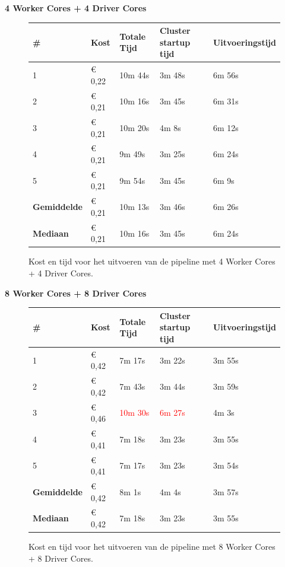 \textbf{4 Worker Cores + 4 Driver Cores}

\begin{figure}[H]%
    \centering
    \begin{tabularx}{1\textwidth}{ |X|X|X|X|X| }
        \hline
        \textbf{\#} & \textbf{Kost} & \textbf{Totale Tijd} & \textbf{Cluster startup tijd} & \textbf{Uitvoeringstijd} \\
        \hline 
        1 & € 0,22 & 10m 44s &  3m 48s & 6m 56s \\
        \hline
        2 & € 0,21 & 10m 16s & 3m 45s & 6m 31s \\
        \hline
        3 & € 0,21 & 10m 20s & 4m 8s & 6m 12s \\
        \hline
        4 & € 0,21 & 9m 49s & 3m 25s & 6m 24s \\
        \hline
        5 & € 0,21 & 9m 54s & 3m 45s & 6m 9s \\
        \hline
        \textbf{Gemiddelde} & € 0,21 & 10m 13s & 3m 46s & 6m 26s \\
        \hline
        \textbf{Mediaan} & € 0,21 & 10m 16s & 3m 45s & 6m 24s \\
        \hline
    \end{tabularx}
    \caption{Kost en tijd voor het uitvoeren van de pipeline met 4 Worker Cores + 4 Driver Cores.}
\end{figure}

\textbf{8 Worker Cores + 8 Driver Cores}

\begin{figure}[H]%
    \centering
    \begin{tabularx}{1\textwidth}{ |X|X|X|X|X| }
        \hline
        \textbf{\#} & \textbf{Kost} & \textbf{Totale Tijd} & \textbf{Cluster startup tijd} & \textbf{Uitvoeringstijd} \\
        \hline 
        1 & € 0,42 & 7m 17s & 3m 22s & 3m 55s \\
        \hline
        2 & € 0,42 & 7m 43s & 3m 44s & 3m 59s \\
        \hline
        3 & € 0,46 & \textcolor{red}{10m 30s} & \textcolor{red}{6m 27s} & 4m 3s \\
        \hline
        4 & € 0,41 & 7m 18s & 3m 23s & 3m 55s \\
        \hline
        5 & € 0,41 & 7m 17s & 3m 23s & 3m 54s \\
        \hline
        \textbf{Gemiddelde} & € 0,42 & 8m 1s & 4m 4s & 3m 57s \\
        \hline
        \textbf{Mediaan} & € 0,42 & 7m 18s & 3m 23s & 3m 55s \\
        \hline
    \end{tabularx}
    \caption{Kost en tijd voor het uitvoeren van de pipeline met 8 Worker Cores + 8 Driver Cores.}
\end{figure}


